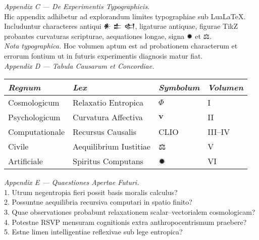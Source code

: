 \documentclass[12pt]{article}
\begin{document}
\begin{spacing}{1.2}
\textit{Appendix C — De Experimentis Typographicis.}\\
Hic appendix adhibetur ad explorandum limites typographiae sub LuaLaTeX. 
Includuntur characteres antiqui 𒀭 𒉺 𒊕, ligaturae antiquae, figurae TikZ probantes curvaturas scripturae, aequationes longae, signa ✹ et ⚖.\\
\textit{Nota typographica.} Hoc volumen aptum est ad probationem characterum et errorum fontium ut in futuris experimentis diagnosis matur fiat.\\[1em]

\textit{Appendix D — Tabula Causarum et Concordiae.}\\
\begin{center}
\begin{tabular}{llll}
\textit{Regnum} & \textit{Lex} & \textit{Symbolum} & \textit{Volumen} \\
\hline
Cosmologicum & Relaxatio Entropica & $\Phi$ & I\\
Psychologicum & Curvatura Affectiva & $\mathbf{v}$ & II\\
Computationale & Recursus Causalis & CLIO & III–IV\\
Civile & Aequilibrium Iustitiae & ⚖ & V\\
Artificiale & Spiritus Computans & ✹ & VI\\
\end{tabular}
\end{center}

\textit{Appendix E — Quaestiones Apertae Futuri.}\\
1. Utrum negentropia fieri possit basis moralis calculus?\\
2. Possuntne aequilibria recursiva computari in spatio finito?\\
3. Quae observationes probabunt relaxationem scalar–vectorialem cosmologicam?\\
4. Potestne RSVP mensuram cognitionis extra anthropocentrismum praebere?\\
5. Estne limen intelligentiae reflexivae sub lege entropica?\\[1em]


\end{spacing}
\end{document}
